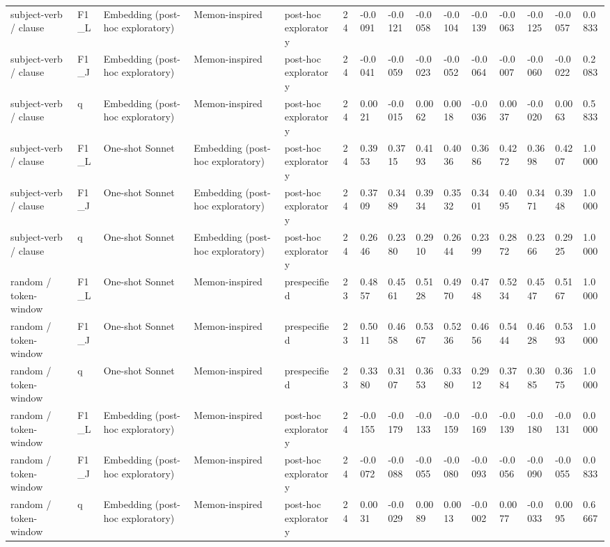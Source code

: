\begin{table}[t]
{\begin{tabular}{lllllllllllllll}
subject-verb / clause & F1\_L & Embedding (post-hoc exploratory) & Memon-inspired & post-hoc exploratory & 24 & -0.0091 & -0.0121 & -0.0058 & -0.0104 & -0.0139 & -0.0063 & -0.0125 & -0.0057 & 0.0833 \\
subject-verb / clause & F1\_J & Embedding (post-hoc exploratory) & Memon-inspired & post-hoc exploratory & 24 & -0.0041 & -0.0059 & -0.0023 & -0.0052 & -0.0064 & -0.0007 & -0.0060 & -0.0022 & 0.2083 \\
subject-verb / clause & q & Embedding (post-hoc exploratory) & Memon-inspired & post-hoc exploratory & 24 & 0.0021 & -0.0015 & 0.0062 & 0.0018 & -0.0036 & 0.0037 & -0.0020 & 0.0063 & 0.5833 \\
subject-verb / clause & F1\_L & One-shot Sonnet & Embedding (post-hoc exploratory) & post-hoc exploratory & 24 & 0.3953 & 0.3715 & 0.4193 & 0.4036 & 0.3686 & 0.4272 & 0.3698 & 0.4207 & 1.0000 \\
subject-verb / clause & F1\_J & One-shot Sonnet & Embedding (post-hoc exploratory) & post-hoc exploratory & 24 & 0.3709 & 0.3489 & 0.3934 & 0.3532 & 0.3401 & 0.4095 & 0.3471 & 0.3948 & 1.0000 \\
subject-verb / clause & q & One-shot Sonnet & Embedding (post-hoc exploratory) & post-hoc exploratory & 24 & 0.2646 & 0.2380 & 0.2910 & 0.2644 & 0.2399 & 0.2872 & 0.2366 & 0.2925 & 1.0000 \\
random / token-window & F1\_L & One-shot Sonnet & Memon-inspired & prespecified & 23 & 0.4857 & 0.4561 & 0.5128 & 0.4970 & 0.4748 & 0.5234 & 0.4547 & 0.5167 & 1.0000 \\
random / token-window & F1\_J & One-shot Sonnet & Memon-inspired & prespecified & 23 & 0.5011 & 0.4658 & 0.5367 & 0.5236 & 0.4656 & 0.5444 & 0.4628 & 0.5393 & 1.0000 \\
random / token-window & q & One-shot Sonnet & Memon-inspired & prespecified & 23 & 0.3380 & 0.3107 & 0.3653 & 0.3380 & 0.2912 & 0.3784 & 0.3085 & 0.3675 & 1.0000 \\
random / token-window & F1\_L & Embedding (post-hoc exploratory) & Memon-inspired & post-hoc exploratory & 24 & -0.0155 & -0.0179 & -0.0133 & -0.0159 & -0.0169 & -0.0139 & -0.0180 & -0.0131 & 0.0000 \\
random / token-window & F1\_J & Embedding (post-hoc exploratory) & Memon-inspired & post-hoc exploratory & 24 & -0.0072 & -0.0088 & -0.0055 & -0.0080 & -0.0093 & -0.0056 & -0.0090 & -0.0055 & 0.0833 \\
random / token-window & q & Embedding (post-hoc exploratory) & Memon-inspired & post-hoc exploratory & 24 & 0.0031 & -0.0029 & 0.0089 & 0.0013 & -0.0002 & 0.0077 & -0.0033 & 0.0095 & 0.6667 \\

\end{tabular}}
\end{table}
